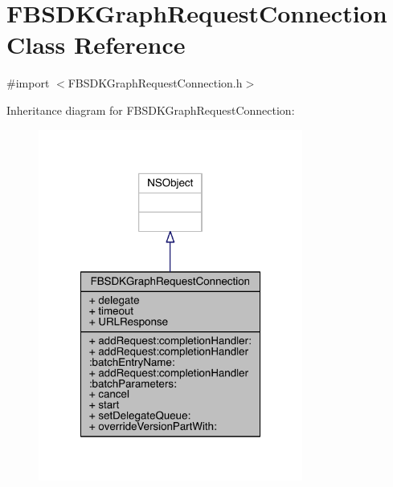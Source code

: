 \hypertarget{interface_f_b_s_d_k_graph_request_connection}{\section{F\-B\-S\-D\-K\-Graph\-Request\-Connection Class Reference}
\label{interface_f_b_s_d_k_graph_request_connection}
}


{\ttfamily \#import $<$F\-B\-S\-D\-K\-Graph\-Request\-Connection.\-h$>$}



Inheritance diagram for F\-B\-S\-D\-K\-Graph\-Request\-Connection\-:
\nopagebreak
\begin{figure}[H]
\begin{center}
\leavevmode
\includegraphics[width=246pt]{interface_f_b_s_d_k_graph_request_connection__inherit__graph}
\end{center}
\end{figure}


